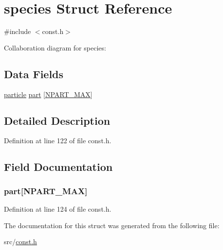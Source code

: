 \hypertarget{structspecies}{}\section{species Struct Reference}
\label{structspecies}


{\ttfamily \#include $<$const.\+h$>$}



Collaboration diagram for species\+:
\subsection*{Data Fields}
\begin{DoxyCompactItemize}
\item 
\hyperlink{structparticle}{particle} \hyperlink{structspecies_ac43956b887c29495426226042f0af0c2}{part} \mbox{[}\hyperlink{const_8h_a24a37647221c5fd0df346699465195e0}{N\+P\+A\+R\+T\+\_\+\+M\+A\+X}\mbox{]}
\end{DoxyCompactItemize}


\subsection{Detailed Description}


Definition at line 122 of file const.\+h.



\subsection{Field Documentation}
\hypertarget{structspecies_ac43956b887c29495426226042f0af0c2}{}
\subsubsection[{part}]{ part\mbox{[}{\bf N\+P\+A\+R\+T\+\_\+\+M\+A\+X}\mbox{]}}\label{structspecies_ac43956b887c29495426226042f0af0c2}


Definition at line 124 of file const.\+h.



The documentation for this struct was generated from the following file\+:\begin{DoxyCompactItemize}
\item 
src/\hyperlink{const_8h}{const.\+h}\end{DoxyCompactItemize}

